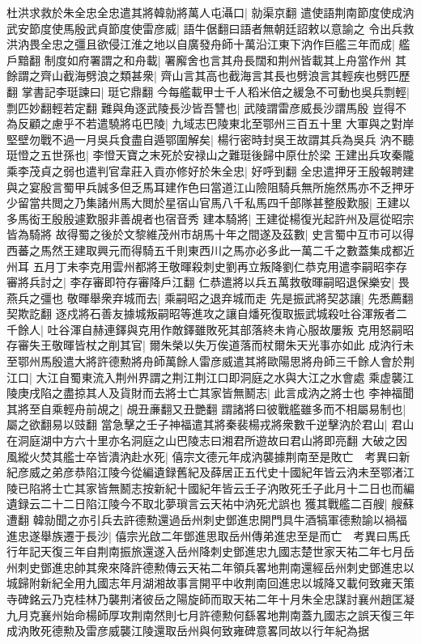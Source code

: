杜洪求救於朱全忠全忠遣其將韓勍將萬人屯灄口|{
	勍渠京翻}
遣使語荆南節度使成汭武安節度使馬殷武貞節度使雷彦威|{
	語牛倨翻曰語者無朝廷詔敕以意諭之}
令出兵救洪汭畏全忠之彊且欲侵江淮之地以自廣發舟師十萬沿江東下汭作巨艦三年而成|{
	艦戶黯翻}
制度如府署謂之和舟載|{
	署廨舍也言其舟長闊和荆州皆載其上舟當作州}
其餘謂之齊山截海劈浪之類甚衆|{
	齊山言其高也截海言其長也劈浪言其輕疾也劈匹歷翻}
掌書記李珽諫曰|{
	珽它鼎翻}
今每艦載甲士千人稻米倍之緩急不可動也吳兵剽輕|{
	剽匹妙翻輕若定翻}
難與角逐武陵長沙皆吾讐也|{
	武陵謂雷彦威長沙謂馬殷}
豈得不為反顧之慮乎不若遣驍將屯巴陵|{
	九域志巴陵東北至鄂州三百五十里}
大軍與之對岸堅壁勿戰不過一月吳兵食盡自遁鄂圍解矣|{
	楊行密時封吳王故謂其兵為吳兵}
汭不聽珽憕之五世孫也|{
	李憕天寶之末死於安禄山之難珽後歸中原仕於梁}
王建出兵攻秦隴乘李茂貞之弱也遣判官韋莊入貢亦修好於朱全忠|{
	好呼到翻}
全忠遣押牙王殷報聘建與之宴殷言蜀甲兵誠多但乏馬耳建作色曰當道江山險阻騎兵無所施然馬亦不乏押牙少留當共閲之乃集諸州馬大閲於星宿山官馬八千私馬四千部隊甚整殷歎服|{
	王建以多馬衒王殷殷遽歎服非善覘者也宿音秀}
建本騎將|{
	王建從楊復光起許州及扈從昭宗皆為騎將}
故得蜀之後於文黎維茂州市胡馬十年之間遂及茲數|{
	史言蜀中互市可以得西蕃之馬然王建取興元而得騎五千則東西川之馬亦必多此一萬二千之數蓋集成都近州耳}
五月丁未李克用雲州都將王敬暉殺刺史劉再立叛降劉仁恭克用遣李嗣昭李存審將兵討之|{
	李存審即符存審降戶江翻}
仁恭遣將以兵五萬救敬暉嗣昭退保樂安|{
	畏燕兵之彊也}
敬暉舉衆弃城而去|{
	乘嗣昭之退弃城而走}
先是振武將契苾讓|{
	先悉薦翻契欺訖翻}
逐戍將石善友據城叛嗣昭等進攻之讓自燔死復取振武城殺吐谷渾叛者二千餘人|{
	吐谷渾自赫連鐸與克用作敵鐸雖敗死其部落終未肯心服故屢叛}
克用怒嗣昭存審失王敬暉皆杖之削其官|{
	爾朱榮以失万俟道落而杖爾朱天光事亦如此}
成汭行未至鄂州馬殷遣大將許德勲將舟師萬餘人雷彦威遣其將歐陽思將舟師三千餘人會於荆江口|{
	大江自蜀東流入荆州界謂之荆江荆江口即洞庭之水與大江之水會處}
乘虚襲江陵庚戌陷之盡掠其人及貨財而去將士亡其家皆無鬭志|{
	此言成汭之將士也}
李神福聞其將至自乘輕舟前覘之|{
	覘丑亷翻又丑艷翻}
謂諸將曰彼戰艦雖多而不相屬易制也|{
	屬之欲翻易以豉翻}
當急擊之壬子神福遣其將秦裴楊戎將衆數千逆擊汭於君山|{
	君山在洞庭湖中方六十里亦名洞庭之山巴陵志曰湘君所遊故曰君山將即亮翻}
大破之因風縱火焚其艦士卒皆潰汭赴水死|{
	僖宗文德元年成汭襲據荆南至是敗亡　考異曰新紀彦威之弟彦恭陷江陵今從編遺録舊紀及薛居正五代史十國紀年皆云汭未至鄂渚江陵已陷將士亡其家皆無鬭志按新紀十國紀年皆云壬子汭敗死壬子此月十二日也而編遺録云二十二日陷江陵今不取北夢瑣言云天祐中汭死尤誤也}
獲其戰艦二百艘|{
	艘蘇遭翻}
韓勍聞之亦引兵去許德勲還過岳州刺史鄧進忠開門具牛酒犒軍德勲諭以禍福進忠遂舉族遷于長沙|{
	僖宗光啟二年鄧進思取岳州傳弟進忠至是而亡　考異曰馬氏行年記天復三年自荆南振旅還遂入岳州降刺史鄧進忠九國志楚世家天祐二年七月岳州刺史鄧進忠帥其衆來降許德勲傳云天祐二年領兵畧地荆南還經岳州刺史鄧進忠以城歸附新紀全用九國志年月湖湘故事言開平中收荆南回進忠以城降又載何致雍天策寺碑銘云乃克桂林乃襲荆渚彼岳之陽旋師而取天祐二年十月朱全忠謀討襄州趙匡凝九月克襄州始命楊師厚攻荆南然則七月許德勲何繇畧地荆南蓋九國志之誤天復三年成汭敗死德勲及雷彦威襲江陵還取岳州與何致雍碑意畧同故以行年紀為据}
